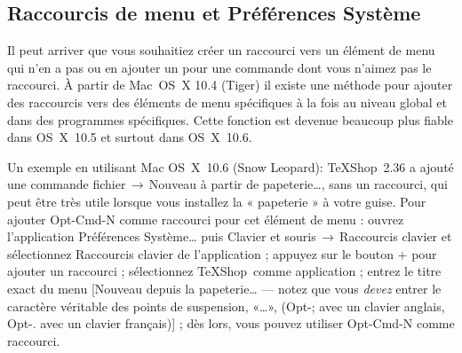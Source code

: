 \documentclass[11pt,french]{article}
\newcommand{\TS}{\textsf{\TeX Shop}}
\newcommand{\cmd}[1]{\textsf{#1}}
\newcommand{\mnu}[1]{\textsf{#1}}
\newcommand{\To}{\,\(\to\)\,}
\begin{document}

\subsection{Raccourcis de menu et Préférences Système}

Il peut arriver que vous souhaitiez créer un raccourci vers un élément de menu qui n'en a pas ou en ajouter un pour une commande dont vous n'aimez pas le raccourci. À partir de Mac~OS~X 10.4 (Tiger) il existe une méthode pour ajouter des raccourcis vers des éléments de menu spécifiques à la fois au niveau global et dans des programmes spécifiques. Cette fonction est devenue beaucoup plus fiable dans OS~X~10.5 et surtout dans OS~X~10.6.

Un exemple en utilisant Mac OS~X~10.6 (Snow Leopard): \TS\ 2.36 a ajouté une commande \mnu{fichier}\To\mnu{Nouveau à partir de papeterie…}, sans un raccourci, qui peut être très utile lorsque vous installez la « papeterie » à votre guise. Pour ajouter \cmd{Opt-Cmd-N} comme raccourci pour cet élément de menu : ouvrez l'application \textsf{Préférences Système…} puis \mnu{Clavier et souris}\To\mnu{Raccourcis clavier} et sélectionnez \mnu{Raccourcis clavier de l'application} ; appuyez sur le bouton \mnu{+} pour ajouter un raccourci ; sélectionnez \TS\ comme application ; entrez le titre exact du menu [\mnu{Nouveau depuis la papeterie…} --- notez que vous \emph{devez} entrer le caractère véritable des points de suspension, «…», (\cmd{Opt-;} avec un clavier anglais, \cmd{Opt-.} avec un clavier français)] ; dès lors, vous pouvez utiliser \cmd{Opt-Cmd-N} comme raccourci.

%
\end{document}
